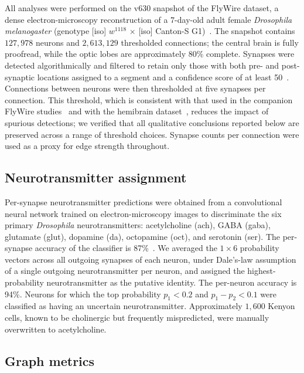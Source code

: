 \documentclass[11pt]{article}
\begin{document}
All analyses were performed on the v630 snapshot of the FlyWire dataset, a
dense electron-microscopy reconstruction of a 7-day-old adult female
\textit{Drosophila melanogaster} (genotype [iso] $w^{1118}$ $\times$ [iso]
Canton-S G1)~\cite{dorkenwald2024flywire,schlegel2024whole}. The snapshot
contains $127{,}978$ neurons and $2{,}613{,}129$ thresholded connections;
the central brain is fully proofread, while the optic lobes are
approximately 80\% complete. Synapses were detected algorithmically and
filtered to retain only those with both pre- and post-synaptic locations
assigned to a segment and a confidence score of at least
50~\cite{turner2021automated}. Connections between neurons were then
thresholded at five synapses per connection. This threshold, which is
consistent with that used in the companion FlyWire
studies~\cite{dorkenwald2024flywire,schlegel2024whole} and with the
hemibrain dataset~\cite{scheffer2020connectome}, reduces the impact of
spurious detections; we verified that all qualitative conclusions reported
below are preserved across a range of threshold choices. Synapse counts
per connection were used as a proxy for edge strength throughout.

\subsection{Neurotransmitter assignment}

Per-synapse neurotransmitter predictions were obtained from a
convolutional neural network trained on electron-microscopy images to
discriminate the six primary \textit{Drosophila} neurotransmitters:
acetylcholine (ach), GABA (gaba), glutamate (glut), dopamine (da),
octopamine (oct), and serotonin (ser). The per-synapse accuracy of the
classifier is 87\%~\cite{eckstein2024neurotransmitter}. We averaged the
$1\times 6$ probability vectors across all outgoing synapses of each neuron,
under Dale's-law assumption of a single outgoing neurotransmitter per
neuron, and assigned the highest-probability neurotransmitter as the
putative identity. The per-neuron accuracy is 94\%. Neurons for which the
top probability $p_1 < 0.2$ and $p_1 - p_2 < 0.1$ were classified as having
an uncertain neurotransmitter. Approximately $1{,}600$ Kenyon cells, known
to be cholinergic but frequently mispredicted, were manually overwritten
to acetylcholine.

\subsection{Graph metrics}
\end{document}
